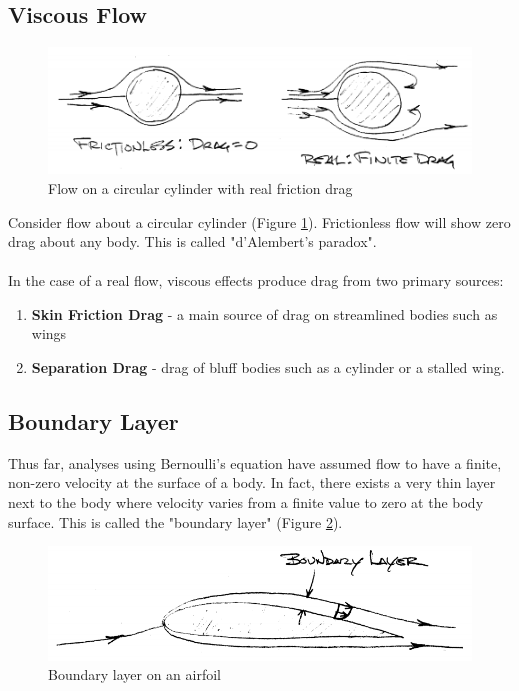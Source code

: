 \documentclass[draft=false, titlepage]{article}
\begin{document}
\subsection{Viscous Flow}
\begin{figure}[ht]
	\centering
	\includegraphics[width=0.8\linewidth]{Figures/p14_frictionDrag.PNG}
	\caption{Flow on a circular cylinder with real friction drag}
	\label{fig:p14_frictionDrag}
\end{figure}
Consider flow about a circular cylinder (Figure \ref{fig:p14_frictionDrag}). Frictionless flow will show zero drag about any body. This is called "d'Alembert's paradox".
\paragraph*{}In the case of a real flow, viscous effects produce drag from two primary sources:
\begin{enumerate}
	\item \textbf{Skin Friction Drag}  - a main source of drag on streamlined bodies such as wings
	\item \textbf{Separation Drag} - drag of bluff bodies such as a cylinder or a stalled wing.
\end{enumerate}

\subsection{Boundary Layer}
Thus far, analyses using Bernoulli's equation have assumed flow to have a finite, non-zero velocity at the surface of a body. In fact, there exists a very thin layer next to the body where velocity varies from a finite value to zero at the body surface. This is called the "boundary layer" (Figure \ref{fig:p15_boundaryLayer}).
\begin{figure}[ht]
	\centering
	\includegraphics[width=0.5\linewidth]{Figures/p15_boundaryLayer.PNG}
	\caption{Boundary layer on an airfoil}
	\label{fig:p15_boundaryLayer}
\end{figure}
\end{document}
